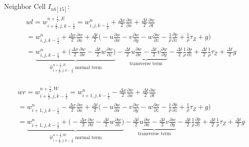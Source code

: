 \documentclass{article}
\numberwithin{equation}{subsection}
\begin{document}
Neighbor Cell $I_{nb[15]}$:
\begin{align}
\begin{split}
& wl = w_{i+\frac{1}{2},j,k-\frac{1}{2}}^{n+\frac{1}{2},E} = w_{i,j,k-\frac{1}{2}}^n + \frac{\Delta x}{2}\frac{\partial w}{\partial x} + \frac{\Delta t}{2}\frac{\partial w}{\partial t} \\
&= w_{i,j,k-\frac{1}{2}}^n + \frac{\Delta x}{2} \frac{\partial w}{\partial x} + \frac{\Delta t}{2} \Big( -u\frac{\partial w}{\partial x} -v\frac{\partial w}{\partial y} -w\frac{\partial w}{\partial z} - \frac{1}{\rho}\frac{\partial p}{\partial z} +\frac{1}{\rho}\tau_Z + g\Big) \\
&= \underbrace{w_{i,j,k-\frac{1}{2}}^n + \Big(\frac{\Delta x}{2}\frac{\partial w}{\partial x} - \frac{\Delta t}{2} w\frac{\partial w}{\partial z}\Big)}_\text{$\widehat{w}_{i+\frac{1}{2},j,k-\frac{1}{2}}^{n+\frac{1}{2},E}$ normal term} -\underbrace{\frac{\Delta t}{2}u\frac{\partial w}{\partial x} - \frac{\Delta t}{2}v\frac{\partial w}{\partial y}}_\text{transverse term} - \frac{\Delta t}{2}\frac{1}{\rho}\frac{\partial p}{\partial z} + \frac{\Delta t}{2}\frac{1}{\rho}\tau_Z + \frac{\Delta t}{2}g
\end{split}
\end{align}

\begin{align}
\begin{split}
& wr = w_{i+\frac{1}{2},j,k-\frac{1}{2}}^{n+\frac{1}{2},W} = w_{i+1,j,k-\frac{1}{2}}^n - \frac{\Delta x}{2}\frac{\partial w}{\partial x} + \frac{\Delta t}{2}\frac{\partial w}{\partial t} \\
&= w_{i+1,j,k-\frac{1}{2}}^n - \frac{\Delta x}{2} \frac{\partial w}{\partial x} + \frac{\Delta t}{2} \Big( -u\frac{\partial w}{\partial x} -v\frac{\partial w}{\partial y} -w\frac{\partial w}{\partial z} - \frac{1}{\rho}\frac{\partial p}{\partial z} +\frac{1}{\rho}\tau_Z + g\Big) \\
&= \underbrace{w_{i+1,j,k-\frac{1}{2}}^n + \Big(-\frac{\Delta x}{2}\frac{\partial w}{\partial x} - \frac{\Delta t}{2} w\frac{\partial w}{\partial z}\Big)}_\text{$\widehat{w}_{i+\frac{1}{2},j,k-\frac{1}{2}}^{n+\frac{1}{2},W}$ normal term} -\underbrace{\frac{\Delta t}{2}u\frac{\partial w}{\partial x} - \frac{\Delta t}{2}v\frac{\partial w}{\partial y}}_\text{transverse term} - \frac{\Delta t}{2}\frac{1}{\rho}\frac{\partial p}{\partial z} + \frac{\Delta t}{2}\frac{1}{\rho}\tau_Z + \frac{\Delta t}{2}g
\end{split}
\end{align}
\end{document}
